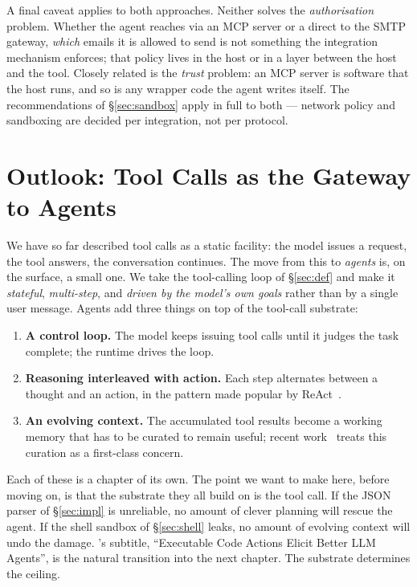 \noindent
A final caveat applies to both approaches. Neither solves the
\emph{authorisation} problem. Whether the agent reaches
 via an MCP server or a direct  to
the SMTP gateway, \emph{which} emails it is allowed to send is not
something the integration mechanism enforces; that policy lives in
the host or in a layer between the host and the tool. Closely
related is the \emph{trust} problem: an MCP server is software
that the host runs, and so is any wrapper code the agent writes
itself. The recommendations of \S\ref{sec:sandbox} apply in full
to both --- network policy and sandboxing are decided per
integration, not per protocol.

\section{Outlook: Tool Calls as the Gateway to Agents}
\label{sec:agents}

We have so far described tool calls as a static facility: the model
issues a request, the tool answers, the conversation continues. The
move from this to \emph{agents} is, on the surface, a small one. We
take the tool-calling loop of \S\ref{sec:def} and make it
\emph{stateful}, \emph{multi-step}, and \emph{driven by the model's
own goals} rather than by a single user message. Agents add three
things on top of the tool-call substrate:

\begin{enumerate}[label=(\roman*)]
\item \textbf{A control loop.} The model keeps issuing tool calls
  until it judges the task complete; the runtime drives the loop.
\item \textbf{Reasoning interleaved with action.} Each step
  alternates between a thought and an action, in the pattern made
  popular by ReAct~\citep{yao2023react}.
\item \textbf{An evolving context.} The accumulated tool results
  become a working memory that has to be curated to remain useful;
  recent work~\citep{zhang2025ace} treats this curation as a
  first-class concern.
\end{enumerate}

\noindent
Each of these is a chapter of its own. The point we want to make
here, before moving on, is that the substrate they all build on is
the tool call. If the JSON parser of \S\ref{sec:impl} is unreliable,
no amount of clever planning will rescue the agent. If the shell
sandbox of \S\ref{sec:shell} leaks, no amount of evolving context
will undo the damage.
\citet{wang2024codeact}'s subtitle, ``Executable Code Actions Elicit
Better LLM Agents'', is the natural transition into the next
chapter. The substrate determines the ceiling.

